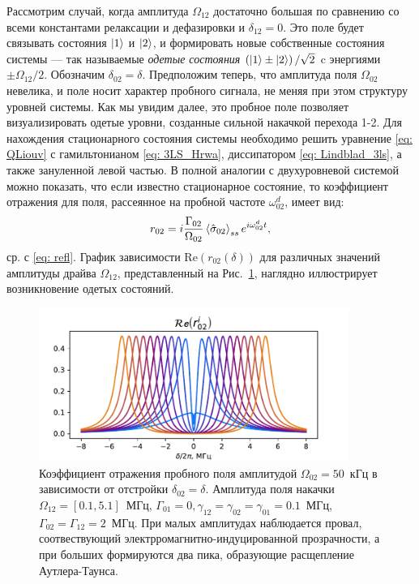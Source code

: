 Рассмотрим случай, когда амплитуда $\Omega_{12}$ достаточно большая по сравнению со всеми константами релаксации и дефазировки и $\delta_{12}=0$. Это поле будет связывать состояния $\ket{1}$ и $\ket{2}$, и формировать новые собственные состояния системы ---  так называемые \textit{одетые состояния} $\left(\ket{1} \pm \ket{2}\right)/\sqrt{2}$ c энергиями $\pm\Omega_{12}/2$. Обозначим $\delta_{02}=\delta$. Предположим теперь, что амплитуда поля $\Omega_{02}$ невелика, и поле носит характер пробного сигнала, не меняя при этом структуру уровней системы. Как мы увидим далее, это пробное поле позволяет визуализировать одетые уровни, созданные сильной накачкой перехода 1-2. Для нахождения стационарного состояния системы необходимо решить уравнение \eqref{eq: QLiouv} с гамильтонианом \eqref{eq: 3LS_Hrwa},  диссипатором \eqref{eq: Lindblad_3ls}, а также зануленной левой частью. В полной аналогии с двухуровневой системой можно показать, что если известно стационарное состояние, то коэффициент отражения для поля, рассеянное на пробной частоте $\omega^d_{02}$, имеет вид:
\begin{equation}
r_{02} = i\frac{\Gamma_{02}}{\Omega_{02}}\braket{\hat{\sigma}_{02}}_{ss}e^{i\omega^d_{02}t}, 
\end{equation}
ср. с \eqref{eq: refl}. График зависимости $\text{Re}\left({r_{02}}(\delta)\right)$ для различных значений амплитуды драйва $\Omega_{12}$, представленный на Рис.~\ref{img: EIT_ATS}, наглядно иллюстрирует возникновение одетых состояний. 
\begin{figure}[ht]
	\centering
	\includegraphics[width=0.9\textwidth]{images/EIT_ATS_plot.pdf}	 
	\caption[Электромагнитно индуцированная прозрачность и расщепление Аутлера-Таунса в $\Lambda$-системе]{Коэффициент отражения пробного поля  амплитудой $\Omega_{02}=50$~кГц в зависимости от отстройки $\delta_{02}=\delta.$ Амплитуда поля накачки $\Omega_{12} = [0.1, 5.1]$~МГц, $\Gamma_{01}=0, \gamma_{12}=\gamma_{02}=\gamma_{01}=0.1$~МГц,  $\Gamma_{02}=\Gamma_{12}=2$~МГц. При малых амплитудах наблюдается провал, соотвествующий электрромагнитно-индуцированной прозрачности, а при больших формируются два пика, образующие расщепление Аутлера-Таунса.}
	\label{img: EIT_ATS}
\end{figure}
